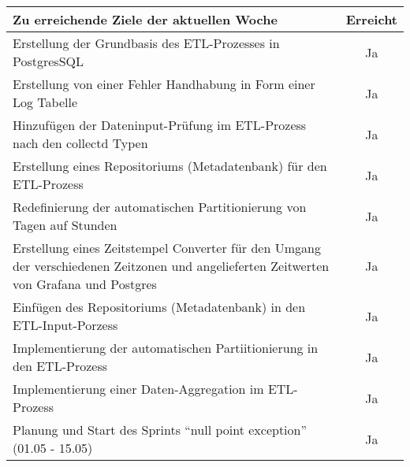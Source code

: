\begin{tabularx}{\textwidth}{Xc}
    \arrayrulecolor{OliveGreen}
    \toprule
    {\bfseries Zu erreichende Ziele der aktuellen Woche} & {\bfseries Erreicht} \\
    \midrule[2pt]
    Erstellung der Grundbasis des ETL-Prozesses in PostgresSQL &Ja \\
    \rowcolor{OliveGreen!15}
    Erstellung von einer Fehler Handhabung in Form einer Log Tabelle &Ja \\
    \rowcolor{White}
    Hinzufügen der Dateninput-Prüfung im ETL-Prozess nach den collectd
    Typen &Ja \\
    \rowcolor{OliveGreen!15}
    Erstellung eines Repositoriums (Metadatenbank) für den ETL-Prozess &Ja \\
    \rowcolor{White}
    Redefinierung der automatischen Partitionierung von Tagen auf Stunden &Ja \\
    \rowcolor{OliveGreen!15}
    Erstellung eines Zeitstempel Converter für den Umgang der verschiedenen 
    Zeitzonen und angelieferten Zeitwerten von Grafana und Postgres &Ja \\
    \rowcolor{White}
    Einfügen des Repositoriums (Metadatenbank) in den ETL-Input-Porzess &Ja \\
    \rowcolor{OliveGreen!15}
    Implementierung der automatischen Partiitionierung in den ETL-Prozess &Ja \\
    \rowcolor{White}
    Implementierung einer Daten-Aggregation im ETL-Prozess &Ja \\
    \rowcolor{OliveGreen!15}
    Planung und Start des Sprints ``null point exception'' (01.05 - 15.05) &Ja \\
    \bottomrule[2pt]
\end{tabularx}
%
\vspace{1cm}
%
